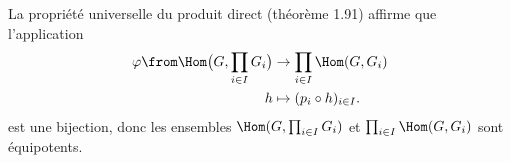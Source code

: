 La propriété universelle du produit direct (théorème 1.91) affirme que l'application
%
\begin{align*}
  \varphi\from\Hom\bigl(G,\prod_{i\in I} G_i\bigr) & \to\prod_{i\in I} \Hom(G,G_i) \\
  h &\mapsto (p_i\circ h)_{i\in I}.
\end{align*}
%
est une bijection, donc les ensembles $\Hom(G,\prod_{i\in I} G_i)$ et $\prod_{i\in I} \Hom(G,G_i)$ sont équipotents.
